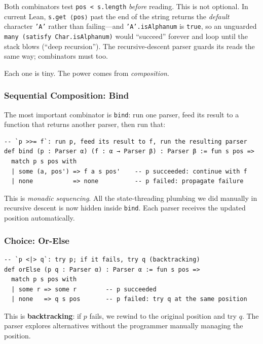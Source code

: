 \documentclass[11pt,a4paper]{article}
\theoremstyle{definition}
\begin{document}
\begin{warning}
Both combinators test \texttt{pos < s.length} \emph{before} reading. This is
not optional. In current Lean, \texttt{s.get ⟨pos⟩} past the end of the string
returns the \emph{default} character \texttt{'A'} rather than failing---and
\texttt{'A'.isAlphanum} is \texttt{true}, so an unguarded
\texttt{many (satisfy Char.isAlphanum)} would ``succeed'' forever and loop
until the stack blows (``deep recursion''). The recursive-descent parser guards
its reads the same way; combinators must too.
\end{warning}

Each one is tiny. The power comes from \emph{composition}.

\subsubsection{Sequential Composition: Bind}

The most important combinator is \texttt{bind}: run one parser, feed its
result to a function that returns another parser, then run that:

\begin{verbatim}
-- `p >>= f`: run p, feed its result to f, run the resulting parser
def bind (p : Parser α) (f : α → Parser β) : Parser β := fun s pos =>
  match p s pos with
  | some (a, pos') => f a s pos'    -- p succeeded: continue with f
  | none           => none          -- p failed: propagate failure
\end{verbatim}

This is \emph{monadic sequencing}. All the state-threading plumbing we did
manually in recursive descent is now hidden inside \texttt{bind}. Each parser
receives the updated position automatically.

\subsubsection{Choice: Or-Else}

\begin{verbatim}
-- `p <|> q`: try p; if it fails, try q (backtracking)
def orElse (p q : Parser α) : Parser α := fun s pos =>
  match p s pos with
  | some r => some r        -- p succeeded
  | none   => q s pos       -- p failed: try q at the same position
\end{verbatim}

This is \textbf{backtracking}: if $p$ fails, we rewind to the original
position and try $q$. The parser explores alternatives without the programmer
manually managing the position.
\end{document}
